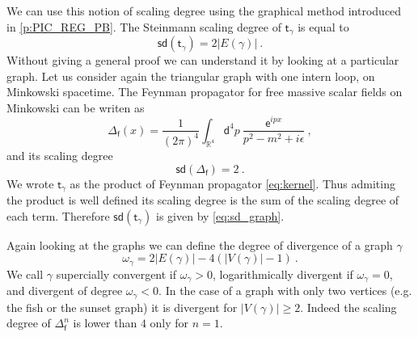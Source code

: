 \documentclass[12pt]{book}
\newcommand{\sd}{\mathsf{sd}}
\newcommand{\abs}[1]{\left|#1\right|}
\let\int\int
\newcommand{\Rbb}{\mathbb{R}}
\newcommand{\dsf}{\mathsf{d}}
\newcommand{\esf}{\mathsf{e}}
\newcommand{\fsf}{\mathsf{f}}
\newcommand{\tsf}{\mathsf{t}}
\theoremstyle{break}
\begin{document}
\bigskip


We can use this notion of scaling degree using the graphical method introduced in \ref{p:PIC_REG_PB}. The Steinmann scaling degree of $\tsf_\gamma$ is equal to 
%
\begin{equation}
\sd(\tsf_\gamma) = 2 \abs{E(\gamma)} \ . 
\label{eq:sd_graph}
\end{equation}
%
Without giving a general proof we can understand it by looking at a particular graph. Let us consider again the triangular graph with one intern loop, on Minkowski spacetime. The Feynman propagator for free massive scalar fields on Minkowski can be writen as
%
\begin{equation*}
\Delta_\fsf(x) = \frac{1}{\left(2\pi\right)^4} \int_{\Rbb^4} \dsf^4p \ \frac{\esf^{ipx}}{p^2 - m^2 + i \epsilon} \ ,
\end{equation*}
%
and its scaling degree 
%
\begin{equation*}
\sd(\Delta_\fsf) = 2 \ .
\end{equation*}
%
We wrote $\tsf_\gamma$ as the product of Feynman propagator \eqref{eq:kernel}. Thus admiting the product is well defined its scaling degree is the sum of the scaling degree of each term. Therefore $\sd(\tsf_\gamma)$ is given by \eqref{eq:sd_graph}. 


\begin{figure}
\end{figure}


Again looking at the graphs we can define the degree of divergence of a graph $\gamma$ 
%
\begin{equation*}
\omega_\gamma = 2 \abs{E(\gamma)} - 4(\abs{V(\gamma)} - 1) \ .
\end{equation*}
%
We call $\gamma$ supercially convergent if $\omega_\gamma  > 0$, logarithmically divergent if $\omega_\gamma = 0$, and divergent of degree $\omega_\gamma < 0$. In the case of a graph with only two vertices (e.g. the fish or the sunset graph) it is divergent for $\abs{V(\gamma)} \geq 2$. Indeed the scaling degree of $\Delta_\fsf^n$ is lower than $4$ only for $n=1$.


\end{document}

